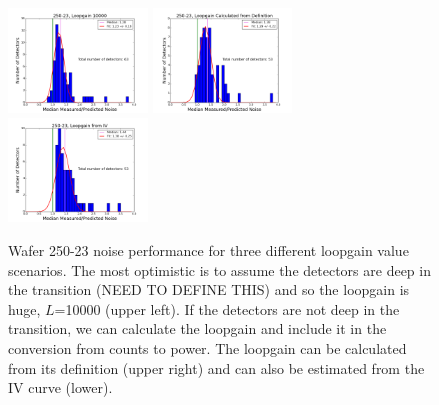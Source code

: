 \begin{figure}[ht]
\centering
   \includegraphics[width=0.33\textwidth]{./figures/250-23_it_meas_pred_ratio_loopgain_10000.png}
   \includegraphics[width=0.33\textwidth]{./figures/250-23_it_meas_pred_ratio_loopgain_calc.png}
   \includegraphics[width=0.33\textwidth]{./figures/250-23_it_meas_pred_ratio_loopgain_iv.png}
\caption{Wafer 250-23 noise performance for three different loopgain value scenarios. The most optimistic is to assume the detectors are
                deep in the transition (NEED TO DEFINE THIS) and so the loopgain is huge, $L$=10000 (upper left). If the detectors are not 
                deep in the transition, we can calculate the loopgain and include it in the conversion from counts to power. The loopgain 
                can be calculated from its definition (upper right) and can also be estimated from the IV curve (lower).  
                \label{fig:effect_of_loopgain}}
\end{figure}


